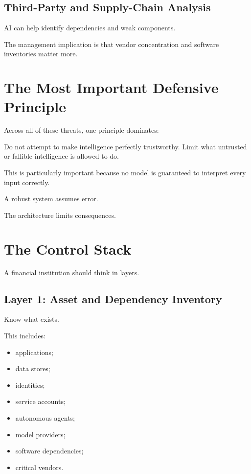 \subsection{Third-Party and Supply-Chain Analysis}

AI can help identify dependencies and weak components.

The management implication is that vendor concentration and software inventories matter more.

\section{The Most Important Defensive Principle}

Across all of these threats, one principle dominates:

\begin{intuition}
Do not attempt to make intelligence perfectly trustworthy. Limit what untrusted or fallible intelligence is allowed to do.
\end{intuition}

This is particularly important because no model is guaranteed to interpret every input correctly.

A robust system assumes error.

The architecture limits consequences.

\section{The Control Stack}

A financial institution should think in layers.

\subsection{Layer 1: Asset and Dependency Inventory}

Know what exists.

This includes:

\begin{itemize}
    \item applications;
    \item data stores;
    \item identities;
    \item service accounts;
    \item autonomous agents;
    \item model providers;
    \item software dependencies;
    \item critical vendors.
\end{itemize}

